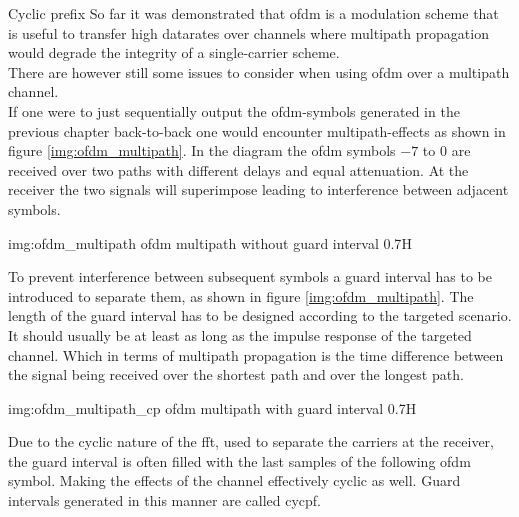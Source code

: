 \begin{subchapter}{Cyclic prefix}
  So far it was demonstrated that \gls{ofdm} is a modulation scheme
  that is useful to transfer high datarates over channels
  where multipath propagation would degrade the integrity of
  a single-carrier scheme. \\
  There are however still some issues to consider when using
  \gls{ofdm} over a multipath channel. \\

  If one were to just sequentially output the \acrshort{ofdm}-symbols
  generated in the previous chapter back-to-back one would encounter multipath-effects
  as shown in figure \ref{img:ofdm_multipath}.
  In the diagram the \acrshort{ofdm} symbols $-7$ to $0$ are received
  over two paths with different delays and equal attenuation.
  At the receiver the two signals will superimpose leading
  to interference between adjacent symbols.

               {img:ofdm_multipath}
               {\acrshort{ofdm} multipath without guard interval}
               {0.7}{H}

  To prevent interference between subsequent symbols a guard interval has
  to be introduced to separate them, as shown in figure \ref{img:ofdm_multipath}.
  The length of the guard interval has to be designed according to
  the targeted scenario. It should usually be at least as long as the
  impulse response of the targeted channel.
  Which in terms of multipath propagation is the time difference between
  the signal being received over the shortest path and over the longest path.

               {img:ofdm_multipath_cp}
               {\acrshort{ofdm} multipath with guard interval}
               {0.7}{H}

  Due to the cyclic nature of the \gls{fft}, used to separate the
  carriers at the receiver, the guard interval
  is often filled with the last samples of the following \gls{ofdm}
  symbol. Making the effects of the channel effectively cyclic
  as well.
  Guard intervals generated in this manner are called \gls{cycpf}.
\end{subchapter}


